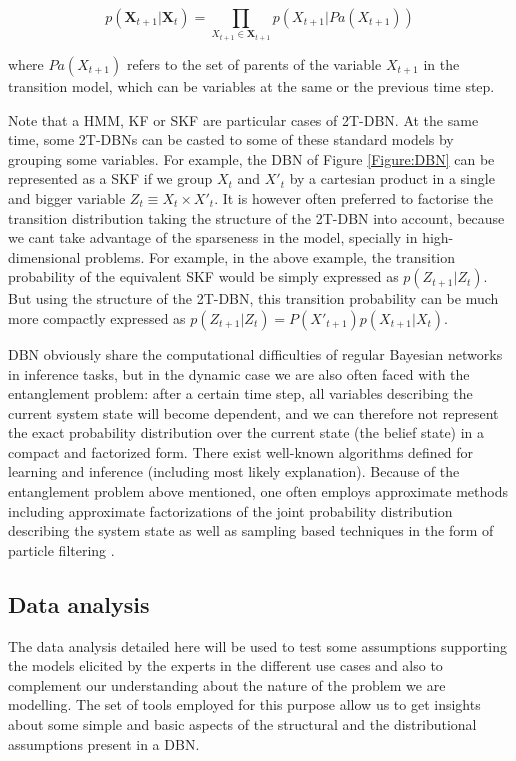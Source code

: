 $$ p(\bm X_{t+1} | \bm X_t) = \prod_{X_{t+1}\in\bm X_{t+1}} p(X_{t+1}|Pa(X_{t+1}))$$ 

\noindent where $Pa(X_{t+1})$ refers to the set of parents of the variable $X_{t+1}$ in the transition model, which can be variables at the same or the previous time step. 

Note that a HMM, KF or SKF are particular cases of 2T-DBN. At the same time, some 2T-DBNs can be casted to some of these standard models by grouping some variables. For example, the DBN of Figure \ref{Figure:DBN} can be represented as a SKF if we group $X_t$ and $X'_t$ by a cartesian product in a single and bigger variable $Z_t \equiv X_t \times X'_t $. It is however often preferred to factorise the transition distribution taking the structure of the 2T-DBN into account, because we cant take advantage of the sparseness in the model, specially in high-dimensional problems. For example, in the above example,  the transition probability of the equivalent SKF would be simply expressed as $p(Z_{t+1}|Z_t)$. But using the structure of the 2T-DBN, this transition probability can be much more compactly expressed as $p(Z_{t+1}|Z_t)=P(X'_{t+1})p(X_{t+1}|X_t)$.

DBN obviously share the computational difficulties of regular Bayesian networks in inference tasks, but in the dynamic case we are also often faced with the entanglement problem: after a certain time step, all variables describing the current system state will become dependent, and we can therefore not represent the exact probability distribution over the current state (the belief state) in a compact and factorized form. There exist well-known algorithms defined for learning and inference (including most likely explanation). Because of the entanglement problem above mentioned, one often employs approximate methods including approximate factorizations of the joint probability distribution describing the system state \cite{BoyenKoller1998} as well as sampling based techniques in the form of particle filtering \cite{Doucet2000}.


\subsection{Data analysis}\label{SubSection:DataAnalysis}

The data analysis detailed here will be used to test some assumptions supporting the models elicited by the experts in the different use cases and also to complement our understanding about the nature of the problem we are modelling. The set of tools employed for this purpose allow us to get insights about some simple and basic aspects of the structural and the distributional assumptions present in a DBN.

